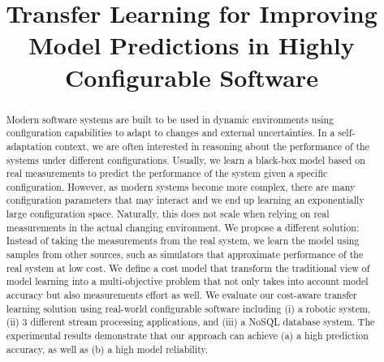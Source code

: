 \documentclass[10pt,conference]{IEEEtran}
\begin{document}
\title{Transfer Learning for Improving Model Predictions in Highly Configurable Software}


\author{

		\and
		\and
}


\maketitle
\begin{abstract}

Modern software systems are built to be used in dynamic environments using configuration capabilities to adapt to changes and external uncertainties. In a self-adaptation context, we are often interested in reasoning about the performance of the systems under different configurations. Usually, we learn a black-box model based on real measurements to predict the performance of the system given a specific configuration. However, as modern systems become more complex, there are many configuration parameters that may interact and we end up learning an exponentially large configuration space. Naturally, this does not scale when relying on real measurements in the actual changing environment.
We propose a different solution: Instead of taking the measurements from the real system, we learn the model using samples from other sources, such as simulators that approximate performance of the real system at low cost. We define a cost model that transform the traditional view of model learning into a multi-objective problem that not only takes into account model accuracy but also measurements effort as well.
We evaluate our cost-aware transfer learning solution using real-world configurable software including (i) a robotic system, (ii) 3 different stream processing applications, and (iii) a NoSQL database system. The experimental results demonstrate that our approach can achieve (a) a high prediction accuracy, as well as (b) a high model reliability. %




\end{abstract}
\end{document}
